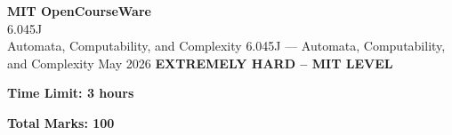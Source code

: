 \documentclass[12pt,a4paper]{exam}
\begin{document}
\begin{center}
{\LARGE \textbf{MIT OpenCourseWare}}\\6.045J\\Automata, Computability, and Complexity
\vspace{0.5cm}
{6.045J} --- {Automata, Computability, and Complexity}
\vspace{0.3cm}
May 2026
\vspace{0.3cm}
\textbf{EXTREMELY HARD -- MIT LEVEL}
\end{center}

\begin{center}
\textbf{Time Limit: 3 hours}
\end{center}

\begin{center}
\textbf{Total Marks: 100}
\end{center}

\vspace{0.5cm}
\end{document}
